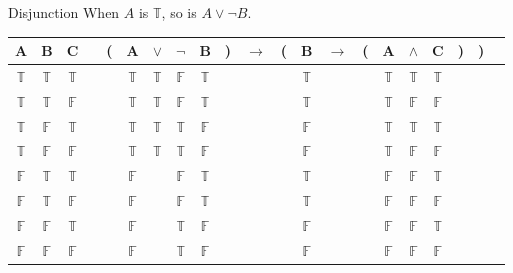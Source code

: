 \documentclass[
  ignorenonframetext,
]{beamer}
\renewcommand{\,}{\text{, }}
\def\True{\mathbb{T}}
\def\False{\mathbb{F}}
\begin{document}
\begin{frame}{Disjunction}
\protect\hypertarget{disjunction}{}
When \(A\) is \(\True\), so is \(A \vee \neg B\).

\begin{center}
\begin{tabular}{@{ }c@{ }@{ }c@{ }@{ }c | c@{ }@{}c@{}@{ }c@{ }@{ }c@{ }@{ }c@{ }@{ }c@{ }@{}c@{}@{ }c@{ }@{}c@{}@{ }c@{ }@{ }c@{ }@{}c@{}@{ }c@{ }@{ }c@{ }@{ }c@{ }@{}c@{}@{}c@{}@{ }c}
A & B & C &  & ( & A & $\vee$ & $\neg$ & B & ) & $\rightarrow$ & ( & B & $\rightarrow$ & ( & A & $\wedge$ & C & ) & ) & \\
\hline 
 $\True$ & $\True$ & $\True$ &  &  & $\True$ & $\True$ & $\False$ & $\True$ &  &&  & $\True$ &&  & $\True$ & $\True$ & $\True$ &  &  & \\
 $\True$ & $\True$ & $\False$ &  &  & $\True$ & $\True$ & $\False$ & $\True$ &  &&  & $\True$ &&  & $\True$ & $\False$ & $\False$ &  &  & \\
 $\True$ & $\False$ & $\True$ &  &  & $\True$ & $\True$ & $\True$ & $\False$ &  &&  & $\False$ &&  & $\True$ & $\True$ & $\True$ &  &  & \\
 $\True$ & $\False$ & $\False$ &  &  & $\True$ & $\True$ & $\True$ & $\False$ &  &&  & $\False$ &&  & $\True$ & $\False$ & $\False$ &  &  & \\
 $\False$ & $\True$ & $\True$ &  &  & $\False$ && $\False$ & $\True$ &  &&  & $\True$ &&  & $\False$ & $\False$ & $\True$ &  &  & \\
 $\False$ & $\True$ & $\False$ &  &  & $\False$ && $\False$ & $\True$ &  &&  & $\True$ &&  & $\False$ & $\False$ & $\False$ &  &  & \\
 $\False$ & $\False$ & $\True$ &  &  & $\False$ && $\True$ & $\False$ &  &&  & $\False$ &&  & $\False$ & $\False$ & $\True$ &  &  & \\
 $\False$ & $\False$ & $\False$ &  &  & $\False$ && $\True$ & $\False$ &  &&  & $\False$ &&  & $\False$ & $\False$ & $\False$ &  &  & \\
\end{tabular}
\end{center}
\end{frame}
\end{document}
